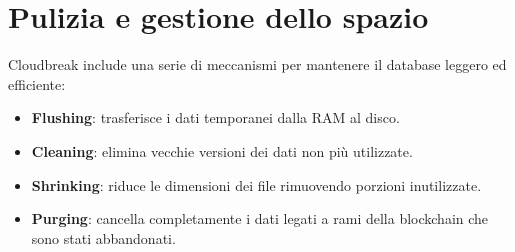\documentclass[a4paper,12pt]{report}
\begin{document}
	\section{Pulizia e gestione dello spazio}
	Cloudbreak include una serie di meccanismi per mantenere il database leggero ed efficiente:
	\begin{itemize}
		\item \textbf{Flushing}: trasferisce i dati temporanei dalla RAM al disco.
		\item \textbf{Cleaning}: elimina vecchie versioni dei dati non più utilizzate.
		\item \textbf{Shrinking}: riduce le dimensioni dei file rimuovendo porzioni inutilizzate.
		\item \textbf{Purging}: cancella completamente i dati legati a rami della blockchain che sono stati abbandonati.
	\end{itemize}
	
\end{document}
